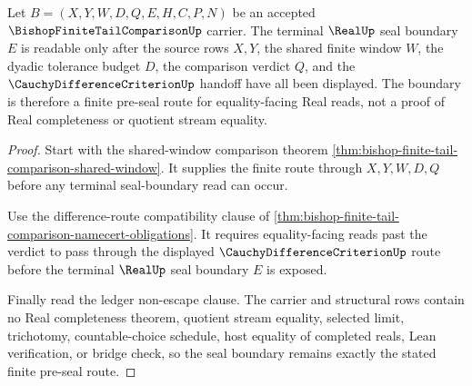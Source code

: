 \begin{theorem}
\label{thm:bishop-finite-tail-comparison-real-seal-boundary}
Let $B=(X,Y,W,D,Q,E,H,C,P,N)$ be an accepted $\BishopFiniteTailComparisonUp$ carrier. The terminal $\RealUp$ seal boundary $E$ is readable only after the source rows $X,Y$, the shared finite window $W$, the dyadic tolerance budget $D$, the comparison verdict $Q$, and the $\CauchyDifferenceCriterionUp$ handoff have all been displayed. The boundary is therefore a finite pre-seal route for equality-facing Real reads, not a proof of Real completeness or quotient stream equality.
\end{theorem}
\begin{proof}
Start with the shared-window comparison theorem \autoref{thm:bishop-finite-tail-comparison-shared-window}. It supplies the finite route through $X,Y,W,D,Q$ before any terminal seal-boundary read can occur.

Use the difference-route compatibility clause of \autoref{thm:bishop-finite-tail-comparison-namecert-obligations}. It requires equality-facing reads past the verdict to pass through the displayed $\CauchyDifferenceCriterionUp$ route before the terminal $\RealUp$ seal boundary $E$ is exposed.

Finally read the ledger non-escape clause. The carrier and structural rows contain no Real completeness theorem, quotient stream equality, selected limit, trichotomy, countable-choice schedule, host equality of completed reals, Lean verification, or bridge check, so the seal boundary remains exactly the stated finite pre-seal route.
\end{proof}


\begin{closurestatus}{\BishopFiniteTailComparisonUp}
  \theoryclosure{\seedClosure}
  \formalstatus{\unformalizedV}
\end{closurestatus}
